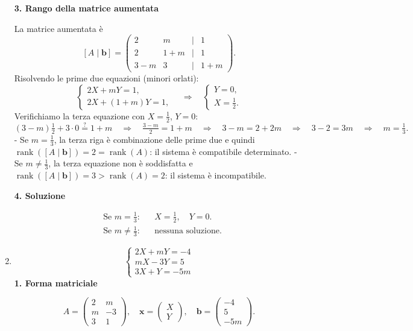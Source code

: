 \documentclass{article}
\theoremstyle{plain}
\theoremstyle{definition}
\theoremstyle{remark}
\begin{document}
\begin{enumerate}
\bigskip
\textbf{3. Rango della matrice aumentata}

La matrice aumentata è
\[
[A\mid \mathbf b]
=
\begin{pmatrix}
2      & m      & \mid & 1\\
2      & 1 + m  & \mid & 1\\
3 - m  & 3      & \mid & 1 + m
\end{pmatrix}.
\]
Risolvendo le prime due equazioni (minori orlati):
\[
\begin{cases}
2X + mY = 1,\\
2X + (1+m)Y = 1,
\end{cases}
\quad\Longrightarrow\quad
\begin{cases}
Y = 0,\\
X = \tfrac12.
\end{cases}
\]
Verifichiamo la terza equazione con \(X=\tfrac12\), \(Y=0\):
\[
(3 - m)\tfrac12 + 3\cdot 0 \stackrel{?}{=} 1 + m
\quad\Longrightarrow\quad
\tfrac{3 - m}{2} = 1 + m
\quad\Longrightarrow\quad
3 - m = 2 + 2m
\quad\Longrightarrow\quad
3 - 2 = 3m
\quad\Longrightarrow\quad
m = \tfrac13.
\]
- Se \(m=\tfrac13\), la terza riga è combinazione delle prime due e quindi \(\operatorname{rank}([A\mid\mathbf b])=2=\operatorname{rank}(A)\): il sistema è compatibile determinato.
- Se \(m\neq\tfrac13\), la terza equazione non è soddisfatta e \(\operatorname{rank}([A\mid\mathbf b])=3>\operatorname{rank}(A)=2\): il sistema è incompatibile.

\bigskip
\textbf{4. Soluzione}

\[
\boxed{
\begin{aligned}
&\text{Se }m = \tfrac13:
&&X = \tfrac12,\quad Y = 0.\\
&\text{Se }m \neq \tfrac13:
&&\text{nessuna soluzione.}
\end{aligned}
}
\]
    \item \[\begin{cases}
        2X+mY=-4\\
        mX-3Y=5\\
        3X+Y=-5m
    \end{cases}\]
    \bigskip
\textbf{1. Forma matriciale}

\[
A = \begin{pmatrix}
2 & m\\
m & -3\\
3 & 1
\end{pmatrix},
\quad
\mathbf{x}=\begin{pmatrix}X\\Y\end{pmatrix},
\quad
\mathbf{b}=\begin{pmatrix}-4\\5\\-5m\end{pmatrix}.
\]


\end{enumerate}
\end{document}
